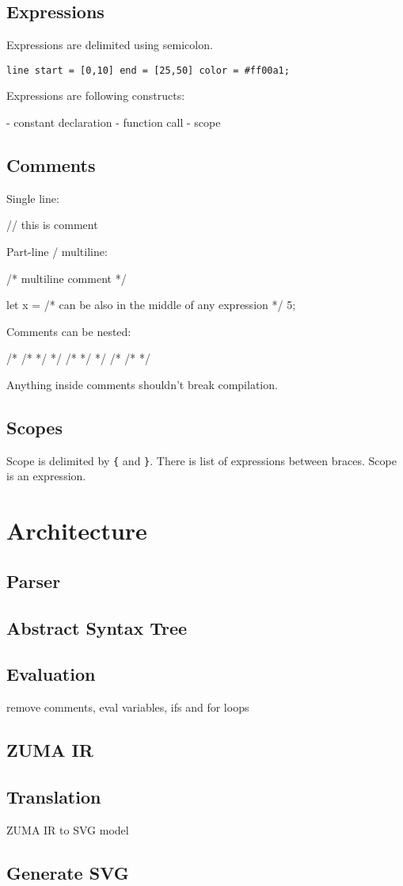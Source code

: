 \documentclass{scrreprt}
\begin{document}
\section{Expressions}

Expressions are delimited using semicolon.

\texttt{line start = [0,10] end = [25,50] color = \#ff00a1;}

Expressions are following constructs:

- constant declaration
- function call
- scope

\section{Comments}

Single line:

    // this is comment

Part-line / multiline:

    /*
        multiline comment
    */

    let x = /* can be also in the middle of any expression */ 5;

Comments can be nested:

    /* /* */ */
    /* */ */
    /* /* */

Anything inside comments shouldn't break compilation.

\section{Scopes}

Scope is delimited by \texttt{\{} and \texttt{\}}. There is list of expressions between braces. Scope is an expression.

\chapter{Architecture}

\section{Parser}

\section{Abstract Syntax Tree}

\section{Evaluation}

remove comments, eval variables, ifs and for loops

\section{ZUMA IR}

\section{Translation}

ZUMA IR to SVG model

\section{Generate SVG}
\end{document}
